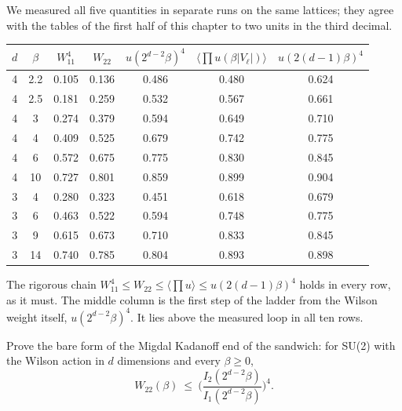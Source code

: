 We measured all five quantities in separate runs on the same lattices; they agree with the tables of the first half of this chapter to two units in the third decimal.

\begin{center}
\footnotesize
\begin{tabular}{ccccccc}
\toprule
$d$ & $\beta$ & $W_{11}^4$ & $W_{22}$ & $u(2^{d-2}\beta)^4$ & $\langle\prod u(\beta|V_\ell|)\rangle$ & $u(2(d-1)\beta)^4$ \\ \midrule
4 & 2.2 & 0.105 & 0.136 & 0.486 & 0.480 & 0.624 \\
4 & 2.5 & 0.181 & 0.259 & 0.532 & 0.567 & 0.661 \\
4 & 3 & 0.274 & 0.379 & 0.594 & 0.649 & 0.710 \\
4 & 4 & 0.409 & 0.525 & 0.679 & 0.742 & 0.775 \\
4 & 6 & 0.572 & 0.675 & 0.775 & 0.830 & 0.845 \\
4 & 10 & 0.727 & 0.801 & 0.859 & 0.899 & 0.904 \\
3 & 4 & 0.280 & 0.323 & 0.451 & 0.618 & 0.679 \\
3 & 6 & 0.463 & 0.522 & 0.594 & 0.748 & 0.775 \\
3 & 9 & 0.615 & 0.673 & 0.710 & 0.833 & 0.845 \\
3 & 14 & 0.740 & 0.785 & 0.804 & 0.893 & 0.898 \\
\bottomrule
\end{tabular}
\end{center}

The rigorous chain $W_{11}^4\le W_{22}\le\langle\prod u\rangle\le u(2(d-1)\beta)^4$ holds in every row, as it must. The middle column is the first step of the ladder from the Wilson weight itself, $u(2^{d-2}\beta)^4$. It lies above the measured loop in all ten rows.

\begin{problem}\label{op:ineq2}
Prove the bare form of the Migdal Kadanoff end of the sandwich: for SU(2) with the Wilson action in $d$ dimensions and every $\beta\ge0$,
\[
W_{22}(\beta)\ \le\ \Big(\frac{I_2(2^{d-2}\beta)}{I_1(2^{d-2}\beta)}\Big)^4 .
\]
\end{problem}

